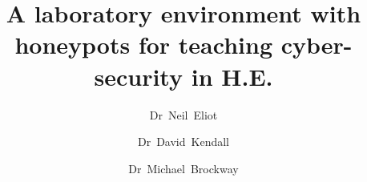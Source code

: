%
%
%
%
%
%
\RequirePackage{fix-cm}
%
\documentclass[smallextended]{svjour3}       %
%
\smartqed%
%
\usepackage{graphicx}
%
%
%
%
%


\title{A laboratory environment with honeypots for teaching cyber-security in H.E.%
}


\author{Dr~Neil~Eliot \and
        Dr~David~Kendall \and
        Dr~Michael~Brockway
}


